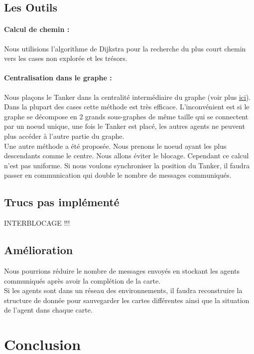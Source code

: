 \documentclass[10pt]{article}
\newcommand\tab[1][0.65cm]{\hspace*{#1}}
\begin{document}
\subsection{Les Outils}
\paragraph{Calcul de chemin :} Nous utilisions l'algorithme de Dijkstra pour la recherche du plus court chemin vers les cases non explorée et les trésors.
\paragraph{Centralisation dans le graphe :} Nous plaçons le Tanker dans la centralité intermédiaire du graphe (voir plus \href{https://en.wikipedia.org/wiki/Betweenness_centrality}{ici}). Dans la plupart des cases cette méthode est très efficace. L'inconvénient est si le graphe se décompose en 2 grands sous-graphes de même taille qui se connectent par un noeud unique, une fois le Tanker est placé, les autres agents ne peuvent plus accéder à l'autre partie du graphe.\\
\tab Une autre méthode a été proposée. Nous prenons le noeud ayant les plus descendants comme le centre. Nous allons éviter le blocage. Cependant ce calcul n'est pas uniforme. Si nous voulons synchroniser la position du Tanker, il faudra passer en communication qui double le nombre de messages communiqués.
	
\subsection{Trucs pas implémenté}
{\Huge INTERBLOCAGE !!!}
\subsection{Amélioration}
Nous pourrions réduire le nombre de messages envoyés en stockant les agents communiqués après avoir la complétion de la carte.\\
\tab Si les agents sont dans un réseau des environnements, il faudra reconstruire la structure de donnée pour sauvegarder les cartes différentes ainsi que la situation de l'agent dans chaque carte.
\section{Conclusion}



	
\end{document}
